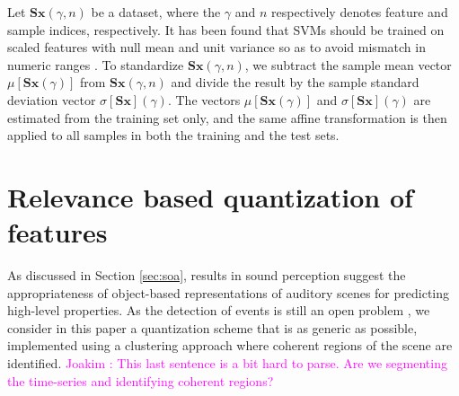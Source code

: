 \documentclass[journal]{IEEEtran}
\newcommand{\ja}[1]{\textcolor{magenta}{Joakim : #1}}
\begin{document}
Let $\mathbf{S}\boldsymbol{x}(\gamma,n)$ be a dataset, where the $\gamma$ and $n$ respectively denotes feature and sample indices, respectively.
It has been found that SVMs should be trained on scaled features with null mean and unit variance so as to avoid mismatch in numeric ranges \cite{Hsu2003}.
To standardize $\mathbf{S}\boldsymbol{x}(\gamma,n)$, we subtract the sample mean vector $\mu[\mathbf{S}\boldsymbol{x}(\gamma)]$ from $\mathbf{S}\boldsymbol{x}(\gamma,n)$ and divide the result by the sample standard deviation vector $\sigma[\mathbf{S}\boldsymbol{x}] (\gamma)$.
The vectors $\mu[\mathbf{S}\boldsymbol{x}(\gamma)]$ and $\sigma[\mathbf{S}\boldsymbol{x}](\gamma)$ are estimated from the training set only, and the same affine transformation is then applied to all samples in both the training and the test sets.

\section{Relevance based quantization of features}
\label{sec:object}



As discussed in Section \ref{sec:soa}, results in sound perception suggest the appropriateness of object-based representations of auditory scenes for predicting high-level properties. As the detection of events is still an open problem \cite{7100934}, we consider in this paper a quantization scheme that is as generic as possible, implemented using a clustering approach where coherent regions of the scene are identified. \ja{This last sentence is a bit hard to parse. Are we segmenting the time-series and identifying coherent regions?}
\end{document}
